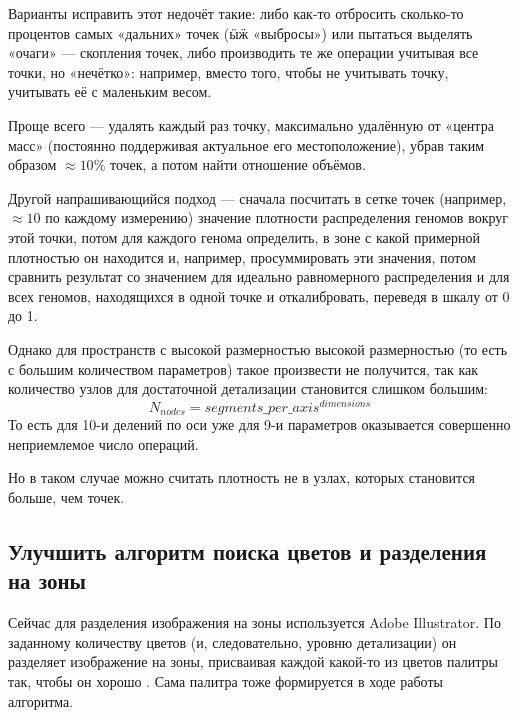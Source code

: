 Варианты исправить этот недочёт такие:
либо как-то отбросить сколько-то процентов самых «дальних» точек (ӹӝ «выбросы») или пытаться выделять «очаги» — скопления точек,
либо производить те же операции учитывая все точки, но «нечётко»: например, вместо того, чтобы не учитывать точку, учитывать её с маленьким весом.

Проще всего — удалять каждый раз точку, максимально удалённую от «центра масс» (постоянно поддерживая актуальное его местоположение),
убрав таким образом $\approx 10\%$ точек, а потом найти отношение объёмов.

Другой напрашивающийся подход — сначала посчитать в сетке точек (например, $\approx 10$ по каждому измерению)
значение плотности распределения геномов вокруг этой точки, потом для каждого генома определить, в зоне с какой примерной плотностью он находится и, например, просуммировать эти значения,
потом сравнить результат со значением для идеально равномерного распределения и для всех геномов, находящихся в одной точке и откалибровать, переведя в шкалу от 0 до 1.

Однако для пространств с высокой размерностью высокой размерностью (то есть с большим количеством параметров) такое произвести не получится, так как количество узлов
для достаточной детализации становится слишком большим:
\begin{equation}
    N_{nodes} = segments\_per\_axis^{dimensions}
\end{equation}
То есть для 10-и делений по оси уже для 9-и параметров оказывается совершенно неприемлемое число операций.

Но в таком случае можно считать плотность не в узлах, которых становится больше, чем точек.



\subsection{Улучшить алгоритм поиска цветов и разделения на зоны}\label{subsec:posterisation_and_zoning}

Сейчас для разделения изображения на зоны используется Adobe Illustrator.
По заданному количеству цветов (и, следовательно, уровню детализации) он разделяет изображение на зоны,
присваивая каждой какой-то из цветов палитры так, чтобы он хорошо .
Сама палитра тоже формируется в ходе работы алгоритма.


